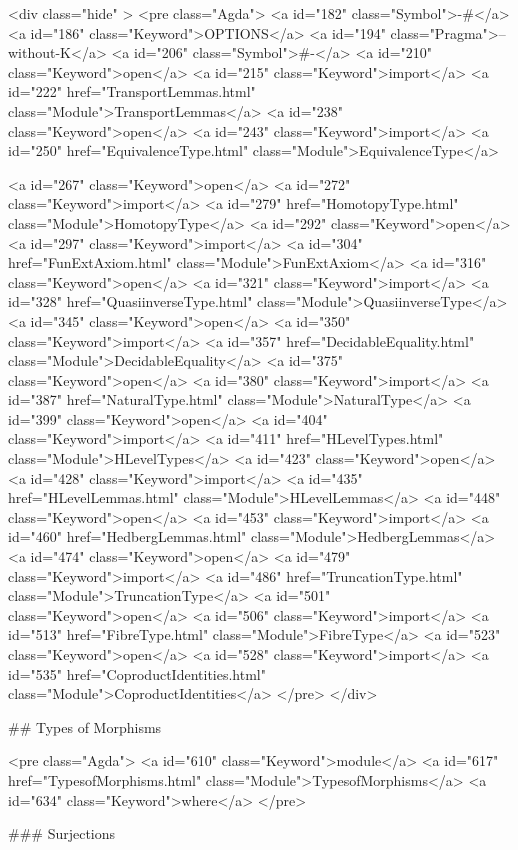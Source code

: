   <div class="hide" >
<pre class="Agda">
<a id="182" class="Symbol">{-#</a> <a id="186" class="Keyword">OPTIONS</a> <a id="194" class="Pragma">--without-K</a> <a id="206" class="Symbol">#-}</a>
<a id="210" class="Keyword">open</a> <a id="215" class="Keyword">import</a> <a id="222" href="TransportLemmas.html" class="Module">TransportLemmas</a>
<a id="238" class="Keyword">open</a> <a id="243" class="Keyword">import</a> <a id="250" href="EquivalenceType.html" class="Module">EquivalenceType</a>

<a id="267" class="Keyword">open</a> <a id="272" class="Keyword">import</a> <a id="279" href="HomotopyType.html" class="Module">HomotopyType</a>
<a id="292" class="Keyword">open</a> <a id="297" class="Keyword">import</a> <a id="304" href="FunExtAxiom.html" class="Module">FunExtAxiom</a>
<a id="316" class="Keyword">open</a> <a id="321" class="Keyword">import</a> <a id="328" href="QuasiinverseType.html" class="Module">QuasiinverseType</a>
<a id="345" class="Keyword">open</a> <a id="350" class="Keyword">import</a> <a id="357" href="DecidableEquality.html" class="Module">DecidableEquality</a>
<a id="375" class="Keyword">open</a> <a id="380" class="Keyword">import</a> <a id="387" href="NaturalType.html" class="Module">NaturalType</a>
<a id="399" class="Keyword">open</a> <a id="404" class="Keyword">import</a> <a id="411" href="HLevelTypes.html" class="Module">HLevelTypes</a>
<a id="423" class="Keyword">open</a> <a id="428" class="Keyword">import</a> <a id="435" href="HLevelLemmas.html" class="Module">HLevelLemmas</a>
<a id="448" class="Keyword">open</a> <a id="453" class="Keyword">import</a> <a id="460" href="HedbergLemmas.html" class="Module">HedbergLemmas</a>
<a id="474" class="Keyword">open</a> <a id="479" class="Keyword">import</a> <a id="486" href="TruncationType.html" class="Module">TruncationType</a>
<a id="501" class="Keyword">open</a> <a id="506" class="Keyword">import</a> <a id="513" href="FibreType.html" class="Module">FibreType</a>
<a id="523" class="Keyword">open</a> <a id="528" class="Keyword">import</a> <a id="535" href="CoproductIdentities.html" class="Module">CoproductIdentities</a>
</pre>
</div>

## Types of Morphisms

<pre class="Agda">
<a id="610" class="Keyword">module</a> <a id="617" href="TypesofMorphisms.html" class="Module">TypesofMorphisms</a> <a id="634" class="Keyword">where</a>
</pre>

### Surjections

